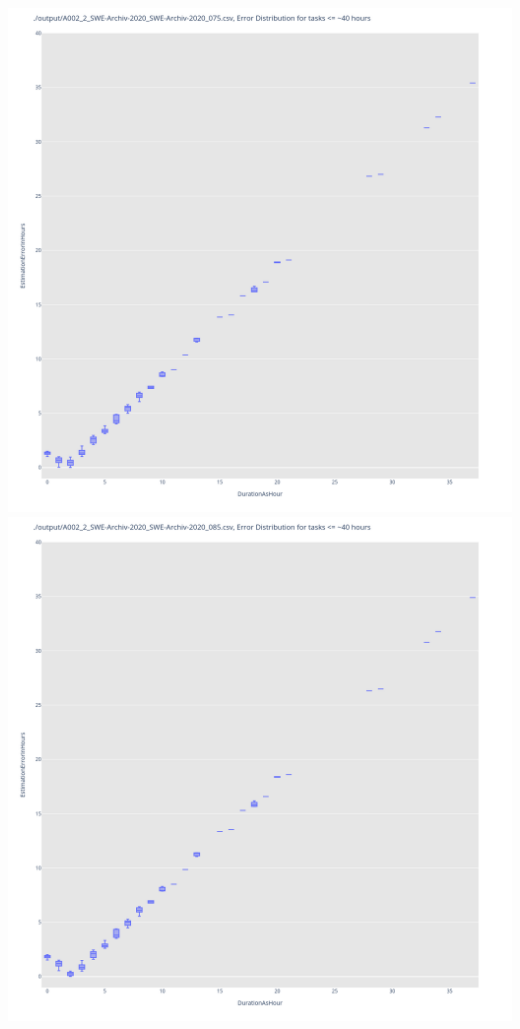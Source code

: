 \includegraphics[width=\textwidth]{Scripts/output/A002_2_SWE-Archiv-2020_SWE-Archiv-2020_075.csv.error_distribution.png}
\includegraphics[width=\textwidth]{Scripts/output/A002_2_SWE-Archiv-2020_SWE-Archiv-2020_085.csv.error_distribution.png}
